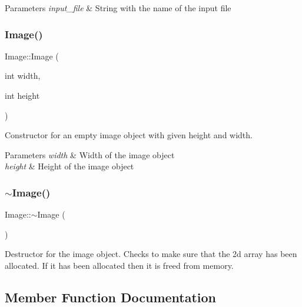 \begin{DoxyParams}{Parameters}
{\em input\+\_\+file} & String with the name of the input file \\
\hline
\end{DoxyParams}
\mbox{\label{class_image_afb0339b802ed560e69eb07358d30198f}} 
\subsubsection{\texorpdfstring{Image()}{Image()}\hspace{0.1cm}{\footnotesize\ttfamily [3/3]}}
{\footnotesize\ttfamily Image\+::\+Image (\begin{DoxyParamCaption}\item[{int}]{width,  }\item[{int}]{height }\end{DoxyParamCaption})}

Constructor for an empty image object with given height and width.


\begin{DoxyParams}{Parameters}
{\em width} & Width of the image object \\
\hline
{\em height} & Height of the image object \\
\hline
\end{DoxyParams}
\mbox{\label{class_image_a0294f63700543e11c0f0da85601c7ae5}} 
\subsubsection{\texorpdfstring{$\sim$\+Image()}{~Image()}}
{\footnotesize\ttfamily Image\+::$\sim$\+Image (\begin{DoxyParamCaption}{ }\end{DoxyParamCaption})}

Destructor for the image object. Checks to make sure that the 2d array has been allocated. If it has been allocated then it is freed from memory. 

\subsection{Member Function Documentation}
\mbox{\label{class_image_a0a529f80b6de38ee9313aeea4c937983}} 
